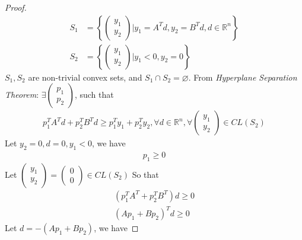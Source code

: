 \begin{proof}
    \begin{align}
        S_1 &= 
        \left\{
            \left(
            \begin{array}{ll}
                y_1 \\
                y_2
            \end{array}
            \right)
            | y_1 = A^Td, y_2 = B^Td, d \in \mathbb{R}^n
        \right\} \\
        S_2 &= 
        \left\{
            \left(
            \begin{array}{ll}
                y_1 \\
                y_2
            \end{array}
            \right)
            | y_1 < 0, y_2 = 0
        \right\} 
    \end{align}
    $S_1, S_2$ are non-trivial convex sets,
    and $S_1 \cap S_2 = \varnothing$.
    From \textit{Hyperplane Separation Theorem}:
    $\exists 
    \left(
    \begin{array}{ll}
        p_1 \\
        p_2
    \end{array}
    \right)$, such that
    \begin{align}
        p_1^TA^Td + p_2^TB^Td \geq p_1^Ty_1 + p_2^Ty_2,
        \forall d \in \mathbb{R}^n, 
        \forall\left(
        \begin{array}{ll}
            y_1 \\
            y_2
        \end{array}
        \right) \in CL(S_2)
    \end{align}
    Let $y_2 = 0, d = 0, y_1 < 0$, we have
    \begin{align}
        p_1 \geq 0
    \end{align}
    Let $\left(
        \begin{array}{ll}
            y_1 \\
            y_2
        \end{array}
        \right) = 
        \left(
        \begin{array}{ll}
            0 \\
            0
        \end{array}
        \right) 
         \in CL(S_2)$
    So that
    \begin{align}
        (p_1^TA^T + p_2^TB^T)d \geq 0 \\
        (Ap_1 + Bp_2)^Td \geq 0
    \end{align}
    Let $d = - (Ap_1 + Bp_2)$, we have

\end{proof}
